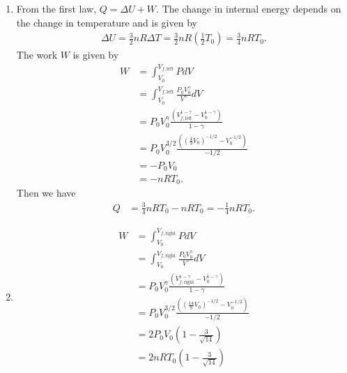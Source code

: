 \documentclass[a4paper,12pt]{article}
\begin{document}
\begin{enumerate}[label=\textbf{[\arabic*]}]
\begin{enumerate}
            \item
                From the first law, $Q = \Delta U + W$. The change in internal energy depends on the change in temperature and is given by
                \begin{align*}
                    \Delta U = \frac{3}{2} nR \Delta T = \frac{3}{2} nR \left( \frac{1}{2} T_0 \right) = \frac{3}{4} nRT_0.
                \end{align*}
                The work $W$ is given by
                \begin{align*}
                    W &= \int_{V_0}^{V_{f, \text{left}}} P dV \\
                    &= \int_{V_0}^{V_{f, \text{left}}} \frac{P_0 V_0^\gamma}{V^\gamma} dV \\
                    &= P_0 V_0^\gamma \frac{\left( V_{f, \text{left}}^{1 - \gamma} - V_0^{1 - \gamma} \right)}{1 - \gamma} \\
                    &= P_0 V_0^{3/2} \frac{\left( \left( \frac{4}{9} V_0 \right)^{-1/2} - V_0^{-1/2} \right)}{-1/2} \\
                    &= -P_0 V_0 \\
                    &= -nRT_0.
                \end{align*}
                Then we have
                \begin{align*}
                    Q &= \frac{3}{4} nRT_0 - nRT_0 = -\frac{1}{4} nRT_0.
                \end{align*}

            \item
                \begin{align*}
                    W &= \int_{V_0}^{V_{f, \text{right}}} P dV \\
                    &= \int_{V_0}^{V_{f, \text{right}}} \frac{P_0 V_0^\gamma}{V^\gamma} dV \\
                    &= P_0 V_0^\gamma \frac{\left( V_{f, \text{right}}^{1 - \gamma} - V_0^{1 - \gamma} \right)}{1 - \gamma} \\
                    &= P_0 V_0^{3/2} \frac{\left( \left( \frac{14}{9} V_0 \right)^{-1/2} - V_0^{-1/2} \right)}{-1/2} \\
                    &= 2 P_0 V_0 \left( 1 - \frac{3}{\sqrt{14}} \right) \\
                    &= 2 nRT_0 \left( 1 - \frac{3}{\sqrt{14}} \right)
                \end{align*}


\end{enumerate}
\end{enumerate}
\end{document}
